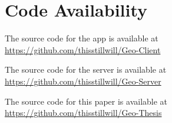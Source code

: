 \section*{Code Availability}

The source code for the app is available at\\\footnotesize\url{https://github.com/thisstillwill/Geo-Client}

The source code for the server is available at\\\footnotesize\url{https://github.com/thisstillwill/Geo-Server}

The source code for this paper is available at\\\footnotesize\url{https://github.com/thisstillwill/Geo-Thesis}
